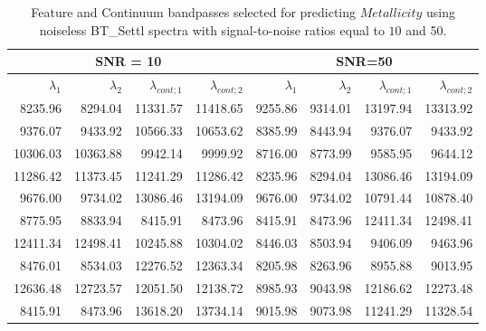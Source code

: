\begin{table}
\begin{center}
\begin{tabular}{rrrr | rrrr}
  \hline
 \multicolumn{4}{c}{SNR = 10} &  \multicolumn{4}{c}{SNR=50} \\
  \hline
$\lambda_1$ & $\lambda_2$ & $\lambda_{cont;1}$ & $\lambda_{cont;2} $ & $\lambda_1$ & $\lambda_2$ & $\lambda_{cont;1}$ & $\lambda_{cont;2} $ \\ 
  \hline

8235.96  & 8294.04  &	11331.57 & 11418.65 & 9255.86 & 9314.01   &     13197.94 & 13313.92  \\
9376.07  & 9433.92  &	10566.33 & 10653.62 & 8385.99 & 8443.94   &     9376.07  & 9433.92    \\
10306.03 & 10363.88 &	 9942.14 & 9999.92  & 8716.00 & 8773.99   &     9585.95  & 9644.12    \\
11286.42 & 11373.45 &	11241.29 & 11286.42 & 8235.96 & 8294.04   &     13086.46 & 13194.09  \\
9676.00  & 9734.02  &	13086.46 & 13194.09 & 9676.00 & 9734.02   &     10791.44 & 10878.40  \\
8775.95  & 8833.94  &	8415.91  & 8473.96  & 8415.91 & 8473.96   &     12411.34 & 12498.41  \\
12411.34 & 12498.41 &	10245.88 & 10304.02 & 8446.03 & 8503.94   &     9406.09  & 9463.96    \\
8476.01  & 8534.03  &	12276.52 & 12363.34 & 8205.98 & 8263.96   &     8955.88  & 9013.95    \\
12636.48 & 12723.57 &	12051.50 & 12138.72 & 8985.93 & 9043.98   &     12186.62 & 12273.48  \\
8415.91  & 8473.96  &	13618.20 & 13734.14 & 9015.98 & 9073.98   &     11241.29 & 11328.54  \\

\hline
\end{tabular}
\caption {Feature and Continuum bandpasses selected for predicting $Metallicity$ 
      using noiseless BT\_Settl spectra with signal-to-noise ratios
      equal to $10$ and 50.} \label{tab:tab_SNR1050_G}
\end{center}
\end{table}


